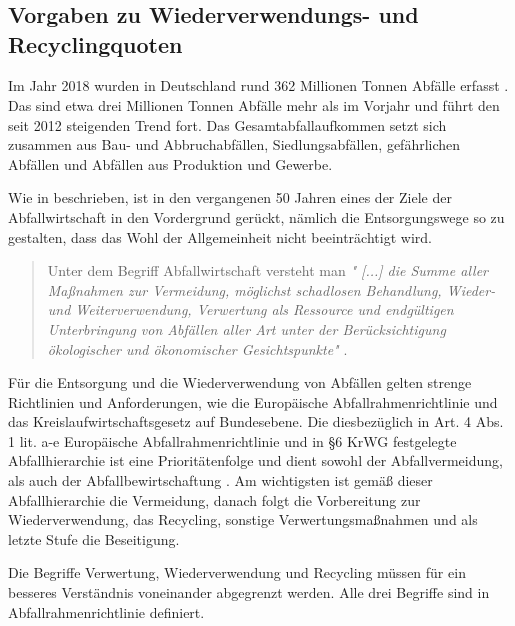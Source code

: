 \chapter{}
\label{sec:state_of_the_art}
\setlength{\parindent}{0pt}

\section{Vorgaben zu Wiederverwendungs- und Recyclingquoten}
\label{sec:VorgabenWRQ}

Im Jahr 2018 wurden in Deutschland rund 362 Millionen Tonnen Abfälle erfasst \cite{DESTATIS2018}. Das sind etwa drei Millionen Tonnen Abfälle mehr als im Vorjahr und führt den seit 2012 steigenden Trend fort. Das Gesamtabfallaufkommen setzt sich zusammen aus Bau- und Abbruchabfällen, Siedlungsabfällen, gefährlichen Abfällen und Abfällen aus Produktion und Gewerbe.

Wie in \citet{Bilitewski} beschrieben, ist in den vergangenen 50 Jahren eines der Ziele der Abfallwirtschaft in den Vordergrund gerückt, nämlich die Entsorgungswege so zu gestalten, dass das Wohl der Allgemeinheit nicht beeinträchtigt wird.  
\begin{quote}
	Unter dem Begriff Abfallwirtschaft versteht man
	\textit{" [...] die Summe aller Maßnahmen zur Vermeidung, möglichst schadlosen Behandlung, Wieder- und Weiterverwendung, Verwertung als Ressource und endgültigen Unterbringung von Abfällen aller Art unter der Berücksichtigung ökologischer und ökonomischer Gesichtspunkte"} \cite{Bilitewski}.
\end{quote}

Für die Entsorgung und die Wiederverwendung von Abfällen gelten strenge Richtlinien und Anforderungen, wie die Europäische Abfallrahmenrichtlinie und das Kreislaufwirtschaftsgesetz auf Bundesebene. Die diesbezüglich in Art. 4 Abs. 1 lit. a-e Europäische Abfallrahmenrichtlinie und in §6 KrWG festgelegte Abfallhierarchie ist eine Prioritätenfolge und dient sowohl der Abfallvermeidung, als auch der Abfallbewirtschaftung \cite{EURichtlinie2008}. Am wichtigsten ist gemäß dieser Abfallhierarchie die Vermeidung, danach folgt die Vorbereitung zur Wiederverwendung, das Recycling, sonstige Verwertungsmaßnahmen und als letzte Stufe die Beseitigung.

Die Begriffe Verwertung, Wiederverwendung und Recycling müssen für ein besseres Verständnis voneinander abgegrenzt werden. Alle drei Begriffe sind in Abfallrahmenrichtlinie definiert.

